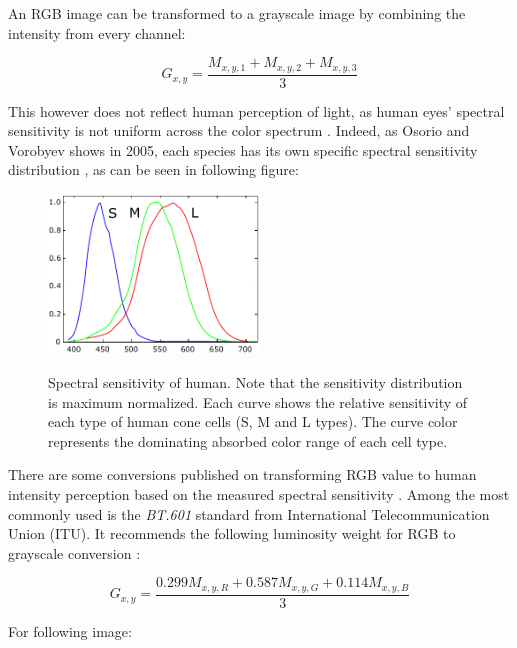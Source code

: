 \documentclass[pdftex,12pt,a4paper]{report}
\begin{document}
An RGB image can be transformed to a grayscale image by combining the intensity from every channel:

$$
G_{x, y} = \frac{M_{x, y, 1} + M_{x, y, 2} + M_{x, y, 3}}{3}
$$

This however does not reflect human perception of light, as human eyes' spectral sensitivity is not uniform across the color spectrum \cite{wyszecki1982color}. Indeed, as Osorio and Vorobyev shows in 2005, each species has its own specific spectral sensitivity distribution \cite{osorio2005photoreceptor}, as can be seen in following figure:


\begin{figure}[H]
\centering
\includegraphics[width=0.5\textwidth]{images/spectral_sensitivity_human.pdf}
\label{fig:spectral_sensitivity}
\caption[Spectral sensitivity of human]{Spectral sensitivity of human. Note that the sensitivity distribution is maximum normalized. Each curve shows the relative sensitivity of each type of human cone cells (S, M and L types). The curve color represents the dominating absorbed color range of each cell type.}
\end{figure}

There are some conversions published on transforming RGB value to human intensity perception based on the measured spectral sensitivity \cite{anderson1996proposal, itu2007studio, itu2015parameter}. Among the most commonly used is the \textit{BT.601} standard from International Telecommunication Union (ITU). It recommends the following luminosity weight for RGB to grayscale conversion \cite{itu2007studio}:

\begin{equation}
G_{x, y} = \frac{0.299 M_{x, y, R} + 0.587  M_{x, y, G} + 0.114 M_{x, y, B}}{3}
\label{equation:rgb_to_gray_def}
\end{equation}

For following image: 
\end{document}
